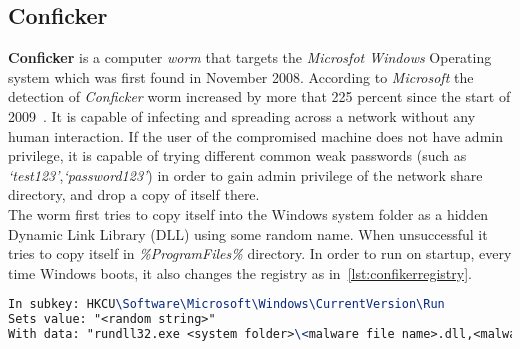 \subsection{Conficker}
\label{sub:Conficker}
\textbf{Conficker} is a computer \emph{worm} that targets the \emph{Microsfot Windows} Operating system which was first found in November 2008.
According to \emph{Microsoft} the detection of \emph{Conficker} worm increased by more that 225 percent since the start of 2009~\cite[]{conficker}.
It is capable of infecting and spreading across a network without any human interaction.
If the user of the compromised machine does not have admin privilege, it is capable of trying different common weak passwords (such as \emph{`test123'},\emph{`password123'}) in order to gain admin privilege of the network share directory, and drop a copy of itself there.\\
The worm first tries to copy itself into the Windows system folder as a hidden Dynamic Link Library (DLL) using some random name. When unsuccessful it tries to copy itself in \emph{\%ProgramFiles\%} directory.
In order to run on startup, every time Windows boots, it also changes the registry as in~\autoref{lst:confikerregistry}.
\begin{lstlisting}[language=TeX,caption={Registry key created by Confiker worm for autostart},label={lst:confikerregistry}]
In subkey: HKCU\Software\Microsoft\Windows\CurrentVersion\Run
Sets value: "<random string>"
With data: "rundll32.exe <system folder>\<malware file name>.dll,<malware parameters>"
\end{lstlisting}
